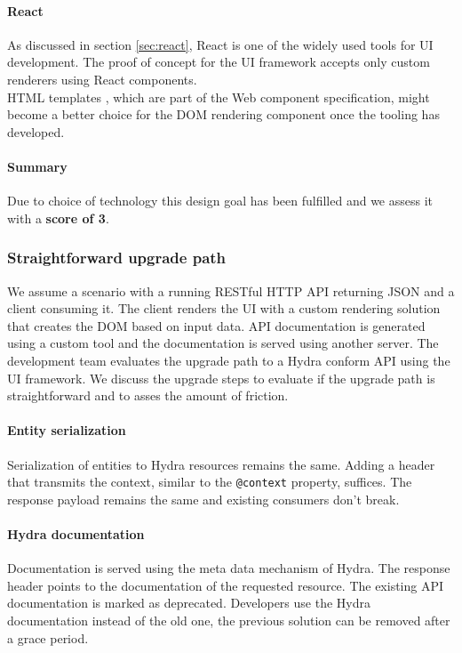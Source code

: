 \paragraph{React}
As discussed in section \ref{sec:react}, React is one of the widely used tools for UI development. The proof of concept for the UI framework accepts only custom renderers using React components. \\
HTML templates \citep{htmltemplates}, which are part of the Web component specification, might become a better choice for the DOM rendering component once the tooling has developed.

\paragraph{Summary}
Due to choice of technology this design goal has been fulfilled and we assess it with a \textbf{score of 3}.

\subsubsection{Straightforward upgrade path}
We assume a scenario with a running RESTful HTTP API returning JSON and a client consuming it. The client renders the UI with a custom rendering solution that creates the DOM based on input data. API documentation is generated using a custom tool and the documentation is served using another server. The development team evaluates the upgrade path to a Hydra conform API using the UI framework. We discuss the upgrade steps to evaluate if the upgrade path is straightforward and to asses the amount of friction.

\paragraph{Entity serialization}
Serialization of entities to Hydra resources remains the same. Adding a header that transmits the context, similar to the \lstinline{@context} property, suffices. The response payload remains the same and existing consumers don't break.

\paragraph{Hydra documentation}
Documentation is served using the meta data mechanism of Hydra. The response header points to the documentation of the requested resource. The existing API documentation is marked as deprecated. Developers use the Hydra documentation instead of the old one, the previous solution can be removed after a grace period.


